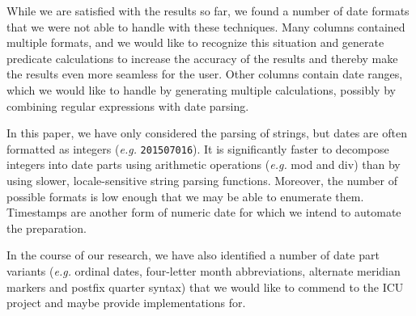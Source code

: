While we are satisfied with the results so far, we found a number of date formats that we were not able to handle with these techniques. Many columns contained multiple formats, and we would like to recognize this situation and generate predicate calculations to increase the accuracy of the results and thereby make the results even more seamless for the user. Other columns contain date ranges, which we would like to handle by generating multiple calculations, possibly by combining regular expressions with date parsing.

In this paper, we have only considered the parsing of strings, but dates are often formatted as integers (\textit{e.g.} \texttt{201507016}). It is significantly faster to decompose integers into date parts using arithmetic operations (\textit{e.g.} mod and div) than by using slower, locale-sensitive string parsing functions. Moreover, the number of possible formats is low enough that we may be able to enumerate them. Timestamps are another form of numeric date for which we intend to automate the preparation.

In the course of our research, we have also identified a number of date part variants (\textit{e.g.} ordinal dates, four-letter month abbreviations, alternate meridian markers and postfix quarter syntax) that we would like to commend to the ICU project and maybe provide implementations for.
